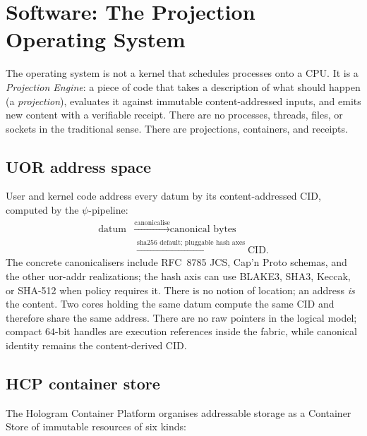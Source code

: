 \documentclass[11pt,letterpaper]{article}
\theoremstyle{remark}
\begin{document}
\section{Software: The Projection Operating System}\label{sec:os}

\begin{plainenglish}
The operating system is not a kernel that schedules processes onto a CPU. It is a
\emph{Projection Engine}: a piece of code that takes a description of what should happen
(a \emph{projection}), evaluates it against immutable content-addressed inputs, and emits
new content with a verifiable receipt. There are no processes, threads, files, or
sockets in the traditional sense. There are projections, containers, and receipts.
\end{plainenglish}

\subsection{UOR address space}

User and kernel code address every datum by its content-addressed CID, computed by the
$\psi$-pipeline:
\[
\begin{aligned}
\text{datum}
&\xrightarrow{\text{canonicalise}} \text{canonical bytes}\\
&\xrightarrow{\text{sha256 default; pluggable hash axes}} \text{CID}.
\end{aligned}
\]
The concrete canonicalisers include RFC~8785 JCS, Cap'n Proto schemas, and the other
uor-addr realizations; the hash axis can use BLAKE3, SHA3, Keccak, or SHA-512 when policy
requires it.
There is no notion of location; an address \emph{is} the content. Two cores holding the
same datum compute the same CID and therefore share the same address. There are no
raw pointers in the logical model; compact $64$-bit handles are execution references
inside the fabric, while canonical identity remains the content-derived CID.

\subsection{HCP container store}

The Hologram Container Platform organises addressable storage as a Container Store of
immutable resources of six kinds:
\end{document}

